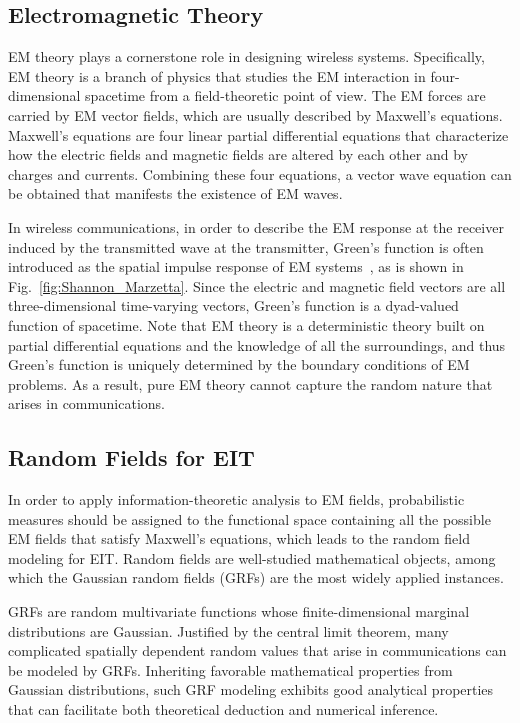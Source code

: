 \documentclass[journal,twocolumn]{IEEEtran}
\begin{document}
\subsection{Electromagnetic Theory}
\label{Sec_2_Subsec_3}
EM theory plays a cornerstone role in designing wireless systems. Specifically, EM theory is a branch of physics that studies the EM interaction in four-dimensional spacetime from a field-theoretic point of view. The EM forces are carried by EM vector fields, which are usually described by Maxwell's equations. Maxwell's equations are four linear partial differential equations that characterize how the electric fields and magnetic fields are altered by each other and by charges and currents. Combining these four equations, a vector wave equation can be obtained that manifests the existence of EM waves. 

In wireless communications, in order to describe the EM response at the receiver induced by the transmitted wave at the transmitter, Green's function is often introduced as the spatial impulse response of EM systems~\cite{stratton2007electromagnetic}, as is shown in Fig.~\ref{fig:Shannon_Marzetta}. Since the electric and magnetic field vectors are all three-dimensional time-varying vectors, Green's function is a dyad-valued function of spacetime. 
Note that EM theory is a deterministic theory built on partial differential equations and the knowledge of all the surroundings, and thus Green's function is uniquely determined by the boundary conditions of EM problems.
As a result, pure EM theory cannot capture the random nature that arises in communications. 

\subsection{Random Fields for EIT}
\label{Sec_2_Subsec_4}
In order to apply information-theoretic analysis to EM fields, probabilistic measures should be assigned to the functional space containing all the possible EM fields that satisfy Maxwell's equations, which leads to the random field modeling for EIT. 
Random fields are well-studied mathematical objects, among which the Gaussian random fields (GRFs) are the most widely applied instances. 

GRFs are random multivariate functions whose finite-dimensional marginal distributions are Gaussian. Justified by the central limit theorem, many complicated spatially dependent random values that arise in communications can be modeled by GRFs.  
Inheriting favorable mathematical properties from Gaussian distributions, such GRF modeling exhibits good analytical properties that can facilitate both theoretical deduction and numerical inference. 
\end{document}

